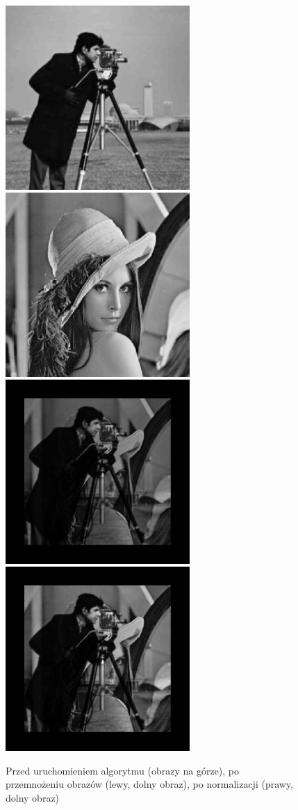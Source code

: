 \documentclass[a4paper,12pt]{book}
\begin{document}
\begin{figure}[H]
	\caption{Przed uruchomieniem algorytmu (obrazy na górze), po przemnożeniu obrazów (lewy, dolny obraz), po normalizacji (prawy, dolny obraz)}
	\includegraphics[width=7cm, height=7cm]{man-unmodified.jpg}
	\includegraphics[width=7cm, height=7cm]{lena-unmodified.png}
	\includegraphics[width=7cm, height=7cm]{2/multiply-gray-images-2.png}
	\includegraphics[width=7cm, height=7cm]{2/multiply-gray-images-2-norm.png}
\end{figure}
\end{document}
